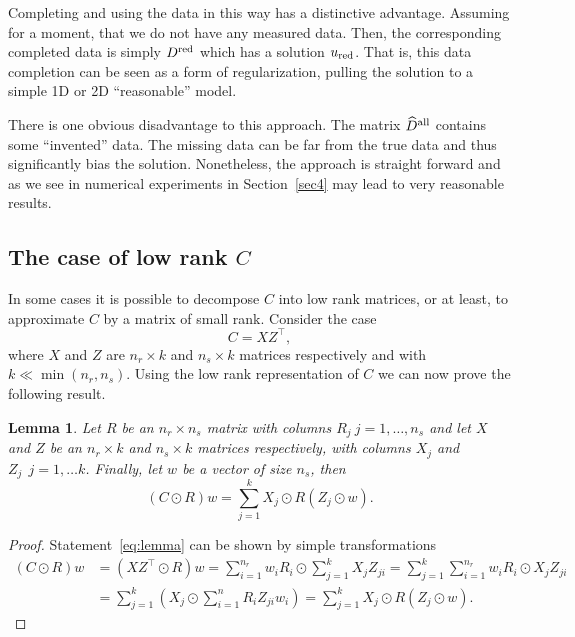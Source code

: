 \documentclass[12pt]{article}
\newtheorem{lem}[thm]{Lemma}
\begin{document}
Completing and using the data in this way has a distinctive advantage. Assuming for a moment, that we do not have any measured data. Then, the corresponding completed data is simply $D^{\rm red}$ which has a solution $u_{\rm red}$. That is, this data completion can be seen as a form of regularization, pulling the solution to a simple 1D or 2D ``reasonable'' model.

There is one obvious disadvantage to this approach. The matrix $\widehat D^{\rm all}$ contains some ``invented'' data. The missing data can be far from the true data and thus significantly  bias the solution. Nonetheless, the approach is straight forward and as we see in numerical experiments in Section~\ref{sec4} may lead to very reasonable results.

\subsection{The case of low rank $C$}
\label{meth2}
In some cases it is possible to decompose $C$ into low rank matrices, or at least, to approximate $C$ by a matrix of small rank. Consider the case
\begin{equation}
\label{CLR}
C = XZ^{\top},
\end{equation}
where $X$ and $Z$ are $n_{r} \times k$ and $n_{s} \times k$ matrices respectively and with $k \ll \min(n_{r},n_{s})$. Using the low rank representation of $C$ we can now prove the following result.
\begin{lem}
Let $R$ be an $n_{r} \times n_{s}$ matrix with columns $R_{j}\ j=1,\ldots,n_{s}$ and let $X$ and $Z$ be an $n_{r} \times k$ and $n_{s} \times k $ matrices respectively, with columns $X_{j}$ and $Z_{j}\ \ j=1,\ldots k$. Finally, let $w$ be a vector of size $n_{s}$, then
\begin{equation} \label{eq:lemma}
(C \odot R) w = \sum_{j=1}^{k} X_{j}   \odot R (Z_{j} \odot w).
\end{equation}
\end{lem}
\begin{proof}
Statement~\eqref{eq:lemma} can be shown by simple transformations
\begin{align*}
(C \odot R) w &= (XZ^{\top} \odot R) w = \sum_{i=1}^{n_{r}}  w_{i} R_{i} \odot \sum_{j=1}^{k} X_{j} Z_{ji} = \sum_{j=1}^{k}  \sum_{i=1}^{n_{r}}  w_{i} R_{i} \odot  X_{j} Z_{ji}\\
& = \sum_{j=1}^{k} \left( X_{j}  \odot \sum_{i=1}^{n} R_{i} Z_{ji} w_{i} \right) = \sum_{j=1}^{k} X_{j}   \odot R (Z_{j} \odot w).
\end{align*}
\end{proof}
\end{document}
